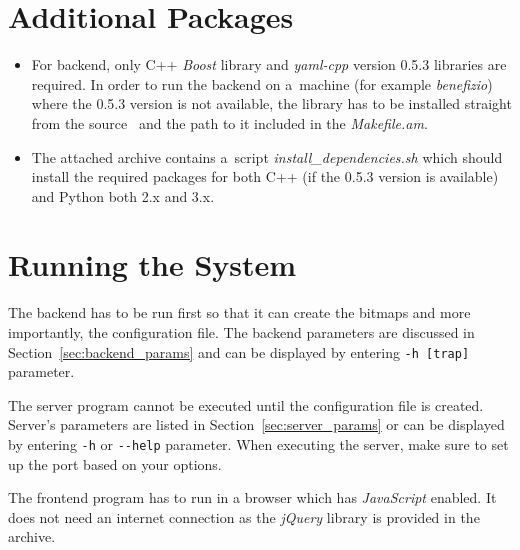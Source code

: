 \section{Additional Packages}
\begin{itemize}
   \item For backend, only C++ \textit{Boost} library and \textit{yaml-cpp} version 0.5.3 libraries are required.
   In order to run the backend on a~machine (for example \textit{benefizio}) where the 0.5.3 version is not available,
   the library has to be installed straight from the source~\cite{yaml_cpp} and the path to it included in the
   \textit{Makefile.am}.
   \item The attached archive contains a~script \textit{install\_dependencies.sh} which should
   install the required packages for both C++ (if the 0.5.3 version is available) and Python both 2.x and 3.x.
\end{itemize}

\section{Running the System}
The backend has to be run first so that it can create the bitmaps and more importantly, the configuration file.
The backend parameters are discussed in Section~\ref{sec:backend_params} and can be displayed by
entering \texttt{-h [trap]} parameter.

The server program cannot be executed until the configuration file is created. Server's parameters
are listed in Section~\ref{sec:server_params} or can be displayed by entering \texttt{-h} or \texttt{-{}-help}
parameter. When executing the server, make sure to set up the port based on your options.

The frontend program has to run in a browser which has \textit{JavaScript} enabled. It does not need
an internet connection as the \textit{jQuery} library is provided in the archive.
